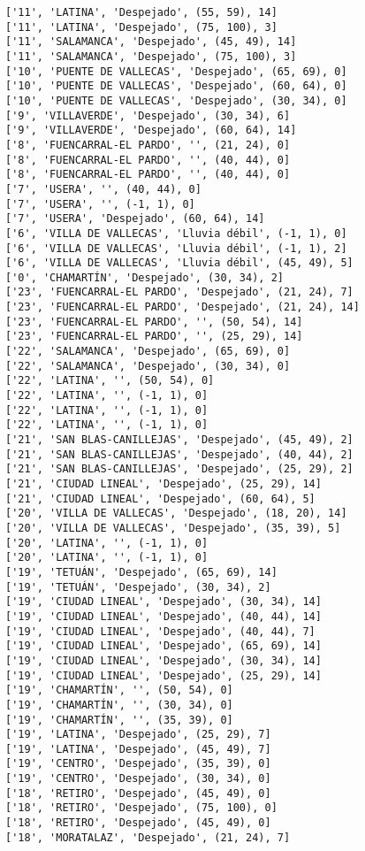 \documentclass[11pt]{article}
\begin{document}
\begin{Verbatim}[commandchars=\\\{\}]
['11', 'LATINA', 'Despejado', (55, 59), 14]
['11', 'LATINA', 'Despejado', (75, 100), 3]
['11', 'SALAMANCA', 'Despejado', (45, 49), 14]
['11', 'SALAMANCA', 'Despejado', (75, 100), 3]
['10', 'PUENTE DE VALLECAS', 'Despejado', (65, 69), 0]
['10', 'PUENTE DE VALLECAS', 'Despejado', (60, 64), 0]
['10', 'PUENTE DE VALLECAS', 'Despejado', (30, 34), 0]
['9', 'VILLAVERDE', 'Despejado', (30, 34), 6]
['9', 'VILLAVERDE', 'Despejado', (60, 64), 14]
['8', 'FUENCARRAL-EL PARDO', '', (21, 24), 0]
['8', 'FUENCARRAL-EL PARDO', '', (40, 44), 0]
['8', 'FUENCARRAL-EL PARDO', '', (40, 44), 0]
['7', 'USERA', '', (40, 44), 0]
['7', 'USERA', '', (-1, 1), 0]
['7', 'USERA', 'Despejado', (60, 64), 14]
['6', 'VILLA DE VALLECAS', 'Lluvia débil', (-1, 1), 0]
['6', 'VILLA DE VALLECAS', 'Lluvia débil', (-1, 1), 2]
['6', 'VILLA DE VALLECAS', 'Lluvia débil', (45, 49), 5]
['0', 'CHAMARTÍN', 'Despejado', (30, 34), 2]
['23', 'FUENCARRAL-EL PARDO', 'Despejado', (21, 24), 7]
['23', 'FUENCARRAL-EL PARDO', 'Despejado', (21, 24), 14]
['23', 'FUENCARRAL-EL PARDO', '', (50, 54), 14]
['23', 'FUENCARRAL-EL PARDO', '', (25, 29), 14]
['22', 'SALAMANCA', 'Despejado', (65, 69), 0]
['22', 'SALAMANCA', 'Despejado', (30, 34), 0]
['22', 'LATINA', '', (50, 54), 0]
['22', 'LATINA', '', (-1, 1), 0]
['22', 'LATINA', '', (-1, 1), 0]
['22', 'LATINA', '', (-1, 1), 0]
['21', 'SAN BLAS-CANILLEJAS', 'Despejado', (45, 49), 2]
['21', 'SAN BLAS-CANILLEJAS', 'Despejado', (40, 44), 2]
['21', 'SAN BLAS-CANILLEJAS', 'Despejado', (25, 29), 2]
['21', 'CIUDAD LINEAL', 'Despejado', (25, 29), 14]
['21', 'CIUDAD LINEAL', 'Despejado', (60, 64), 5]
['20', 'VILLA DE VALLECAS', 'Despejado', (18, 20), 14]
['20', 'VILLA DE VALLECAS', 'Despejado', (35, 39), 5]
['20', 'LATINA', '', (-1, 1), 0]
['20', 'LATINA', '', (-1, 1), 0]
['19', 'TETUÁN', 'Despejado', (65, 69), 14]
['19', 'TETUÁN', 'Despejado', (30, 34), 2]
['19', 'CIUDAD LINEAL', 'Despejado', (30, 34), 14]
['19', 'CIUDAD LINEAL', 'Despejado', (40, 44), 14]
['19', 'CIUDAD LINEAL', 'Despejado', (40, 44), 7]
['19', 'CIUDAD LINEAL', 'Despejado', (65, 69), 14]
['19', 'CIUDAD LINEAL', 'Despejado', (30, 34), 14]
['19', 'CIUDAD LINEAL', 'Despejado', (25, 29), 14]
['19', 'CHAMARTÍN', '', (50, 54), 0]
['19', 'CHAMARTÍN', '', (30, 34), 0]
['19', 'CHAMARTÍN', '', (35, 39), 0]
['19', 'LATINA', 'Despejado', (25, 29), 7]
['19', 'LATINA', 'Despejado', (45, 49), 7]
['19', 'CENTRO', 'Despejado', (35, 39), 0]
['19', 'CENTRO', 'Despejado', (30, 34), 0]
['18', 'RETIRO', 'Despejado', (45, 49), 0]
['18', 'RETIRO', 'Despejado', (75, 100), 0]
['18', 'RETIRO', 'Despejado', (45, 49), 0]
['18', 'MORATALAZ', 'Despejado', (21, 24), 7]

\end{Verbatim}
\end{document}
